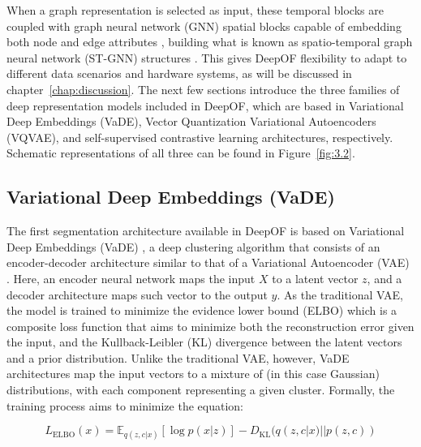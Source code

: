 When a graph representation is selected as input, these temporal blocks are coupled with graph neural network (GNN) spatial blocks capable of embedding both node and edge attributes \cite{Jiang2020Co-embeddingNetworks}, building what is known as spatio-temporal graph neural network (ST-GNN) structures \cite{Li2021MultiscalePrediction, Sahili2023Spatio-TemporalSurvey}. This gives DeepOF flexibility to adapt to different data scenarios and hardware systems, as will be discussed in chapter~\ref{chap:discussion}. The next few sections introduce the three families of deep representation models included in DeepOF, which are based in Variational Deep Embeddings (VaDE), Vector Quantization Variational Autoencoders (VQVAE), and self-supervised contrastive learning architectures, respectively. Schematic representations of all three can be found in Figure~\ref{fig:3.2}.

\subsection{Variational Deep Embeddings (VaDE)}

The first segmentation architecture available in DeepOF is based on Variational Deep Embeddings (VaDE) \cite{Jiang2016VariationalClustering, Manduchi2021AData}, a deep clustering algorithm that consists of an encoder-decoder architecture similar to that of a Variational Autoencoder (VAE) \cite{Kingma2013Auto-EncodingBayes}. Here, an encoder neural network maps the input $X$ to a latent vector $z$, and a decoder architecture maps such vector to the output $y$. As the traditional VAE, the model is trained to minimize the evidence lower bound (ELBO) which is a composite loss function that aims to minimize both the reconstruction error given the input, and the Kullback-Leibler (KL) divergence between the latent vectors and a prior distribution. Unlike the traditional VAE, however, VaDE architectures map the input vectors to a mixture of (in this case Gaussian) distributions, with each component representing a given cluster. Formally, the training process aims to minimize the equation:

\begin{equation}
L_\mathrm{ELBO}(x) = \mathbb{E}_{q(z,c|x)}[\log p(x|z)] - D_\mathrm{KL}(q(z,c|x) || p(z,c))
\label{eq:3.1}
\end{equation}

